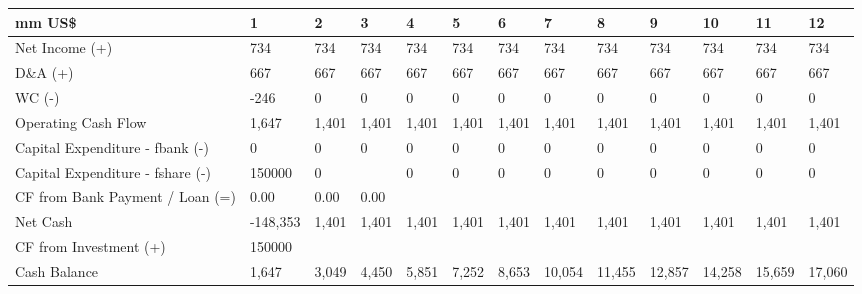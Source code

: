 \begin{tabular}{lllllllllllll}
\hline
 mm US\$                           & 1        & 2     & 3     & 4     & 5     & 6     & 7      & 8      & 9      & 10     & 11     & 12     \\
\hline
 Net Income (+)                   & 734      & 734   & 734   & 734   & 734   & 734   & 734    & 734    & 734    & 734    & 734    & 734    \\
 D\&A (+)                          & 667      & 667   & 667   & 667   & 667   & 667   & 667    & 667    & 667    & 667    & 667    & 667    \\
 WC (-)                           & -246     & 0     & 0     & 0     & 0     & 0     & 0      & 0      & 0      & 0      & 0      & 0      \\
 Operating Cash Flow              & 1,647    & 1,401 & 1,401 & 1,401 & 1,401 & 1,401 & 1,401  & 1,401  & 1,401  & 1,401  & 1,401  & 1,401  \\
 Capital Expenditure - fbank (-)  & 0        & 0     & 0     & 0     & 0     & 0     & 0      & 0      & 0      & 0      & 0      & 0      \\
 Capital Expenditure - fshare (-) & 150000   & 0     &       & 0     & 0     & 0     & 0      & 0      & 0      & 0      & 0      & 0      \\
 CF from Bank Payment / Loan (=)  & 0.00     & 0.00  & 0.00  &       &       &       &        &        &        &        &        &        \\
 Net Cash                         & -148,353 & 1,401 & 1,401 & 1,401 & 1,401 & 1,401 & 1,401  & 1,401  & 1,401  & 1,401  & 1,401  & 1,401  \\
 CF from Investment (+)           & 150000   &       &       &       &       &       &        &        &        &        &        &        \\
 Cash Balance                     & 1,647    & 3,049 & 4,450 & 5,851 & 7,252 & 8,653 & 10,054 & 11,455 & 12,857 & 14,258 & 15,659 & 17,060 \\
\hline
\end{tabular}